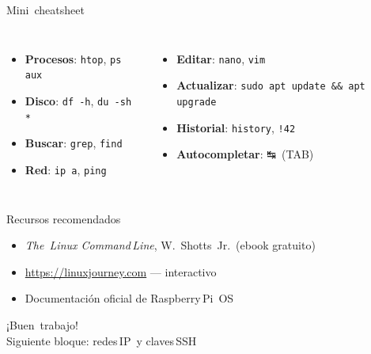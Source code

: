 \documentclass[aspectratio=169,professionalfonts]{beamer}
\begin{document}
\begin{frame}[fragile]{Mini cheatsheet}
\begin{columns}[T,onlytextwidth]
\begin{itemize}
  \item \textbf{Procesos}: \texttt{htop}, \texttt{ps aux}
  \item \textbf{Disco}: \texttt{df -h}, \texttt{du -sh *}
  \item \textbf{Buscar}: \texttt{grep}, \texttt{find}
  \item \textbf{Red}: \texttt{ip a}, \texttt{ping}
\end{itemize}

\begin{itemize}
  \item \textbf{Editar}: \texttt{nano}, \texttt{vim}
  \item \textbf{Actualizar}: \texttt{sudo apt update && apt upgrade}
  \item \textbf{Historial}: \texttt{history}, \texttt{!42}
  \item \textbf{Autocompletar}: ↹ (TAB)
\end{itemize}
\end{columns}
\end{frame}

\begin{frame}{Recursos recomendados}
\begin{itemize}
  \item \emph{The Linux Command Line}, W. Shotts Jr. (ebook gratuito)
  \item \url{https://linuxjourney.com} — interactivo
  \item Documentación oficial de Raspberry Pi OS
\end{itemize}
\end{frame}

\begin{frame}[plain]
  \centering \Huge ¡Buen trabajo!\\[1ex]
  Siguiente bloque: redes IP y claves SSH
\end{frame}
\end{document}
